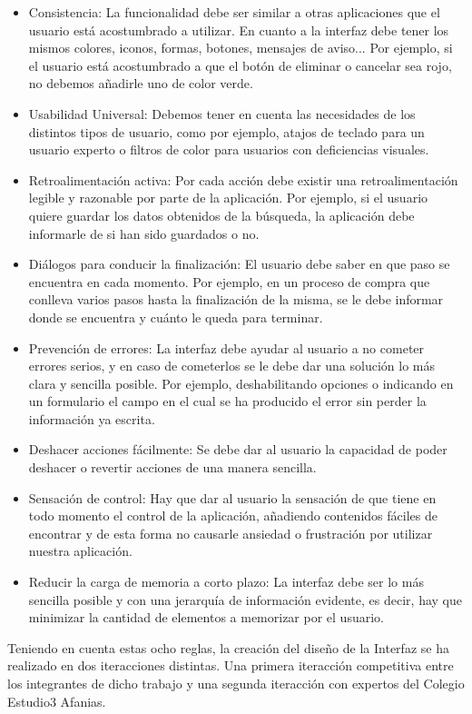 \begin{itemize} 
	\item Consistencia: La funcionalidad debe ser similar a otras aplicaciones que el usuario está acostumbrado a utilizar. En cuanto a la interfaz debe tener los mismos colores, iconos, formas, botones, mensajes de aviso... Por ejemplo, si el usuario está acostumbrado a que el botón de eliminar o cancelar sea rojo, no debemos añadirle uno de color verde.
	\item Usabilidad Universal: Debemos tener en cuenta las necesidades de los distintos tipos de usuario, como por ejemplo, atajos de teclado para un usuario experto o filtros de color para usuarios con deficiencias visuales.
	\item Retroalimentación activa: Por cada acción debe existir una retroalimentación legible y razonable por parte de la aplicación. Por ejemplo, si el usuario quiere guardar los datos obtenidos de la búsqueda, la aplicación debe informarle de si han sido guardados o no.
	\item Diálogos para conducir la finalización: El usuario debe saber en que paso se encuentra en cada momento. Por ejemplo, en un proceso de compra que conlleva varios pasos hasta la finalización de la misma, se le debe informar donde se encuentra y cuánto le queda para terminar.
	\item Prevención de errores: La interfaz debe ayudar al usuario a no cometer errores serios, y en caso de cometerlos se le debe dar una solución lo más clara y sencilla posible. Por ejemplo, deshabilitando opciones o indicando en un formulario el campo en el cual se ha producido el error sin perder la información ya escrita.
	\item Deshacer acciones fácilmente: Se debe dar al usuario la capacidad de poder deshacer o revertir acciones de una manera sencilla. 
	\item Sensación de control: Hay que dar al usuario la sensación de que tiene en todo momento el control de la aplicación, añadiendo contenidos fáciles de encontrar y de esta forma no causarle ansiedad o frustración por utilizar nuestra aplicación.
	\item Reducir la carga de memoria a corto plazo: La interfaz debe ser lo más sencilla posible y con una jerarquía de información evidente, es decir, hay que minimizar la cantidad de elementos a memorizar por el usuario.
\end{itemize}
Teniendo en cuenta estas ocho reglas, la creación del diseño de la Interfaz se ha realizado en dos iteracciones distintas. Una primera iteracción competitiva entre los integrantes de dicho trabajo y una segunda iteracción con expertos del Colegio Estudio3 Afanias. 


